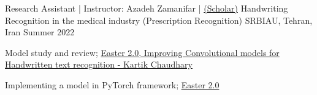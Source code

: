 


\begin{cventries}


\cventry
{Research Assistant | Instructor: Azadeh Zamanifar | \href{https://scholar.google.com/citations?user=YpabXhgAAAAJ&hl=en}{(Scholar)}} %
{Handwriting Recognition in the medical industry (Prescription Recognition)} %
{SRBIAU, Tehran, Iran} %
{Summer 2022} %
{ %
\begin{cvitems}
\item {\vspace{-4.0mm}\fontsize{10}{11}\selectfont Model study and review; \href{https://github.com/kartikgill/Easter2}{Easter 2.0, Improving Convolutional models for Handwritten text recognition - Kartik Chaudhary}}
\item {\fontsize{10}{11}\selectfont Implementing a model in PyTorch framework; \href{https://github.com/kartikgill/Easter2}{Easter 2.0}}
\end{cvitems}
}


\end{cventries}
